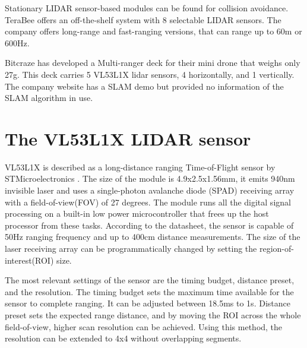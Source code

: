 \documentclass[conference]{IEEEtran}
\begin{document}
Stationary LIDAR sensor-based modules can be found for collision avoidance. TeraBee offers an off-the-shelf 
system with 8 selectable LIDAR sensors. The company offers long-range and fast-ranging versions, that can range
up to 60m or 600Hz.

Bitcraze has developed a Multi-ranger deck for their mini drone that weighs only 27g. This deck carries 5 VL53L1X
lidar sensors, 4 horizontally, and 1 vertically. The company website has a SLAM demo but provided no information
of the SLAM algorithm in use. 

\section{The VL53L1X LIDAR sensor}

VL53L1X is described as a long-distance ranging Time-of-Flight sensor by STMicroelectronics \cite{VL53L1XDatasheet}. 
The size of the module is 4.9x2.5x1.56mm, it emits 940nm invisible laser and uses a single-photon avalanche diode 
(SPAD) receiving array with a field-of-view(FOV) of 27 degrees. The module runs all the digital signal processing on a 
built-in low power microcontroller that frees up the host processor from these tasks. According to the datasheet, 
the sensor is capable of 50Hz ranging frequency and up to 400cm distance measurements. The size of the laser 
receiving array can be programmatically changed by setting the region-of-interest(ROI) size. 



The most relevant settings of the sensor are the timing budget, distance preset, and the resolution.
The timing budget sets the maximum time available for the sensor to complete ranging. It can be adjusted 
between 18.5ms to 1s. Distance preset sets 
the expected range distance, and by moving the ROI across the whole field-of-view, higher scan resolution 
can be achieved. Using this method, the resolution can be extended to 4x4 without overlapping segments.
\end{document}
